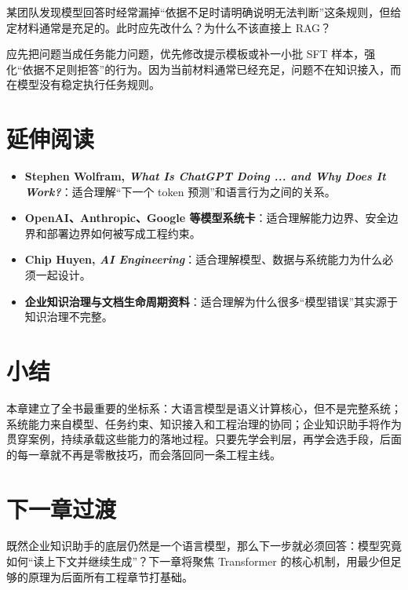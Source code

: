 \begin{exercise}[先判层再判手段]
某团队发现模型回答时经常漏掉“依据不足时请明确说明无法判断”这条规则，但给定材料通常是充足的。此时应先改什么？为什么不该直接上 RAG？
\end{exercise}

\begin{solution}
应先把问题当成{\heiti 任务能力问题}，优先修改提示模板或补一小批 SFT 样本，强化“依据不足则拒答”的行为。因为当前材料通常已经充足，问题不在知识接入，而在模型没有稳定执行任务规则。
\end{solution}

\section{延伸阅读}
\begin{itemize}
  \item \textbf{Stephen Wolfram, \emph{What Is ChatGPT Doing ... and Why Does It Work?}}：适合理解“下一个 token 预测”和语言行为之间的关系。
  \item \textbf{OpenAI、Anthropic、Google 等模型系统卡}：适合理解能力边界、安全边界和部署边界如何被写成工程约束。
  \item \textbf{Chip Huyen, \emph{AI Engineering}}：适合理解模型、数据与系统能力为什么必须一起设计。
  \item \textbf{企业知识治理与文档生命周期资料}：适合理解为什么很多“模型错误”其实源于知识治理不完整。
\end{itemize}

\section{小结}
本章建立了全书最重要的坐标系：大语言模型是语义计算核心，但不是完整系统；系统能力来自模型、任务约束、知识接入和工程治理的协同；企业知识助手将作为贯穿案例，持续承载这些能力的落地过程。只要先学会判层，再学会选手段，后面的每一章就不再是零散技巧，而会落回同一条工程主线。

\section{下一章过渡}
既然企业知识助手的底层仍然是一个语言模型，那么下一步就必须回答：模型究竟如何“读上下文并继续生成”？下一章将聚焦 Transformer 的核心机制，用最少但足够的原理为后面所有工程章节打基础。
